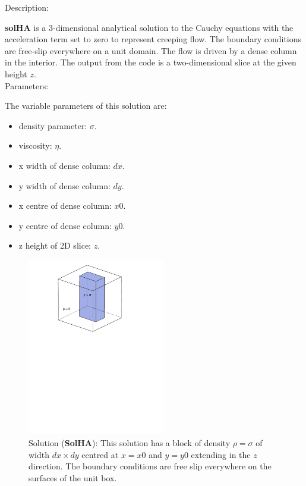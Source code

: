   {\large \fontB Description:}
  
  {\bf solHA} is a 3-dimensional analytical solution to the Cauchy equations with the acceleration term set to zero
  to represent creeping flow. The boundary conditions are free-slip everywhere on a unit domain. 
  The flow is driven by a dense column in the interior. The output from the code is a two-dimensional slice
  at the given height  $z$.
  \\

  {\large \fontB Parameters:}
 
  The variable parameters of this solution are:
  \begin{itemize}
    \item{density parameter: $ \sigma $.}
    \item{viscosity: $\eta$.}
    \item{x width of dense column: $dx$.}
    \item{y width of dense column: $dy$.}
    \item{x centre of dense column: $x0$.}
    \item{y centre of dense column: $y0$.}
    \item{z height of 2D slice: $z$.}
    \end{itemize}

  \begin{figure}
    \includegraphics[width=6cm,clip]{../figs/figHA.pdf}
    \caption[Short caption]{\label{figHA} 
      Solution ({\bf SolHA}):
      This solution has a block of density $\rho = \sigma$
      of width $dx \times dy$ centred at $x=x0$ and $y=y0$    
       extending in the $z$ direction.
      The boundary conditions are free slip everywhere on the surfaces of the unit box.}
  \end{figure} 
  


